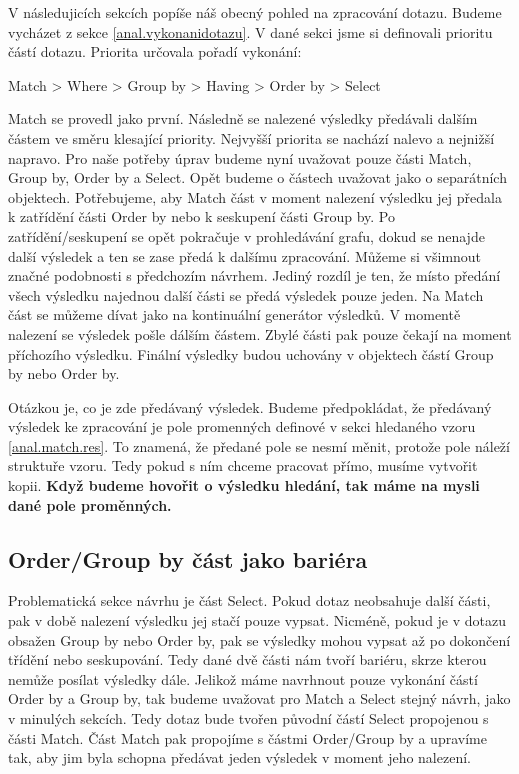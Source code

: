 V následujicích sekcích popíše náš obecný pohled na zpracování dotazu.
Budeme vycházet z sekce \ref{anal.vykonanidotazu}.
V dané sekci jsme si definovali prioritu částí dotazu.
Priorita určovala pořadí vykonání:
\begin{code}
Match > Where > Group by > Having > Order by > Select
\end{code}
Match se provedl jako první.
Následně se nalezené výsledky předávali dalším částem ve směru klesající priority.
Nejvyšší priorita se nachází nalevo a nejnižší napravo.
Pro naše potřeby úprav budeme nyní uvažovat pouze části Match, Group by, Order by a Select.
Opět budeme o částech uvažovat jako o separátních objektech.
Potřebujeme, aby Match část v moment nalezení výsledku jej předala k zatřídění části Order by nebo k seskupení části Group by.
Po zatřídění/seskupení se opět pokračuje v prohledávání grafu, dokud se nenajde další výsledek a ten se zase předá k dalšímu zpracování.
Můžeme si všimnout značné podobnosti s předchozím návrhem. 
Jediný rozdíl je ten, že místo předání všech výsledku najednou další části se předá výsledek pouze jeden.
Na Match část se můžeme dívat jako na kontinuální generátor výsledků. 
V momentě nalezení se výsledek pošle dálším částem.
Zbylé části pak pouze čekají na moment příchozího výsledku.
Finální výsledky budou uchovány v objektech částí Group by nebo Order by. 

Otázkou je, co je zde předávaný výsledek.
Budeme předpokládat, že předávaný výsledek ke zpracování je pole promenných definové v sekci hledaného vzoru \ref{anal.match.res}.
To znamená, že předané pole se nesmí měnit, protože pole náleží struktuře vzoru.
Tedy pokud s ním chceme pracovat přímo, musíme vytvořit kopii.
\textbf{Když budeme hovořit o výsledku hledání, tak máme na mysli dané pole proměnných.}

\subsection{Order/Group by část jako bariéra}

Problematická sekce návrhu je část Select.
Pokud dotaz neobsahuje další části, pak v době nalezení výsledku jej stačí pouze vypsat.
Nicméně, pokud je v dotazu obsažen Group by nebo Order by, pak se výsledky mohou vypsat až po dokončení třídění nebo seskupování.
Tedy dané dvě části nám tvoří bariéru, skrze kterou nemůže posílat výsledky dále.
Jelikož máme navrhnout pouze vykonání částí Order by a Group by, tak budeme uvažovat pro Match a Select stejný návrh, jako v minulých sekcích.
Tedy dotaz bude tvořen původní částí Select propojenou s části Match.
Část Match pak propojíme s částmi Order/Group by a upravíme tak, aby jim byla schopna předávat jeden výsledek v moment jeho nalezení.  

